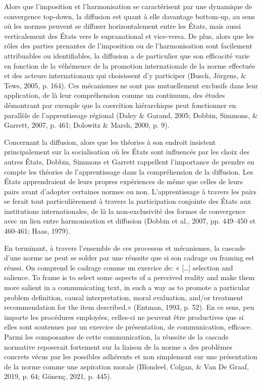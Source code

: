 \documentclass[12pt]{ulaval}
\begin{document}
Alors que l'imposition et l'harmonisation se caractérisent par une dynamique de convergence top-down, la diffusion est quant à elle davantage bottom-up, au sens où les normes peuvent se diffuser horizontalement entre les États, mais aussi verticalement des États vers le supranational et vice-versa. De plus, alors que les rôles des parties prenantes de l'imposition ou de l'harmonisation sont facilement attribuables ou identifiables, la diffusion a de particulier que son efficacité varie en fonction de la véhémence de la promotion internationale de la norme effectuée et des acteurs internationaux qui choisissent d'y participer (Busch, Jörgens, \& Tews, 2005, p. 164). Ces mécanismes ne sont pas mutuellement exclusifs dans leur application, de là leur compréhension comme un continuum, des études démontrant par exemple que la coercition hiérarchique peut fonctionner en parallèle de l'apprentissage régional (Daley \& Garand, 2005; Dobbin, Simmons, \& Garrett, 2007, p. 461; Dolowitz \& Marsh, 2000, p. 9).

Concernant la diffusion, alors que les théories à son endroit insistent principalement sur la socialisation où les États sont influencés par les choix des autres États, Dobbin, Simmons et Garrett rappellent l'importance de prendre en compte les théories de l'apprentissage dans la compréhension de la diffusion. Les États apprendraient de leurs propres expériences de même que celles de leurs pairs avant d'adopter certaines normes ou non. L'apprentissage à travers les pairs se ferait tout particulièrement à travers la participation conjointe des États aux institutions internationales, de là la non-exclusivité des formes de convergence avec un lien entre harmonisation et diffusion (Dobbin et al., 2007, pp. 449--450 et 460-461; Haas, 1979).

En terminant, à travers l'ensemble de ces processus et mécanismes, la cascade d'une norme ne peut se solder par une réussite que si son cadrage ou framing est réussi. On comprend le cadrage comme un exercice de: « {[}\ldots{]} selection and salience. To frame is to select some aspects of a perceived reality and make them more salient in a communicating text, in such a way as to promote a particular problem definition, causal interpretation, moral evaluation, and/or treatment recommendation for the item described.» (Entman, 1993, p. 52). En ce sens, peu importe les procédures employées, celles-ci ne peuvent être productives que si elles sont soutenues par un exercice de présentation, de communication, efficace. Parmi les composantes de cette communication, la réussite de la cascade normative reposerait fortement sur la liaison de la norme a des problèmes concrets vécus par les possibles adhérents et non simplement sur une présentation de la norme comme une aspiration morale (Blondeel, Colgan, \& Van De Graaf, 2019, p. 64; Gönenç, 2021, p. 445).
\end{document}
